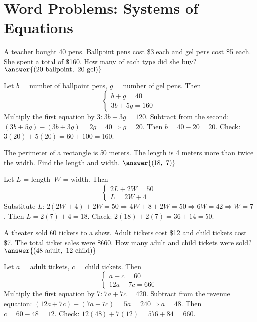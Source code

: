 \documentclass{ximera}
\begin{document}


\section*{Word Problems: Systems of Equations}

\begin{problem}
A teacher bought 40 pens. Ballpoint pens cost \$3 each and gel pens cost \$5 each. She spent a total of \$160. How many of each type did she buy?
$\answer{(20\ \text{ballpoint},\ 20\ \text{gel})}$
\begin{feedback}
Let \(b\) = number of ballpoint pens, \(g\) = number of gel pens. Then
\[
\begin{cases}
b + g = 40\\[4pt]
3b + 5g = 160
\end{cases}
\]
Multiply the first equation by 3: \(3b+3g=120\). Subtract from the second: \((3b+5g)-(3b+3g)=2g=40\Rightarrow g=20\). Then \(b=40-20=20\). Check: \(3(20)+5(20)=60+100=160\).
\end{feedback}
\end{problem}

\begin{problem}
The perimeter of a rectangle is 50 meters. The length is 4 meters more than twice the width. Find the length and width.
$\answer{(18,\ 7)}$
\begin{feedback}
Let \(L\) = length, \(W\) = width. Then
\[
\begin{cases}
2L+2W=50\\[4pt]
L=2W+4
\end{cases}
\]
Substitute \(L\): \(2(2W+4)+2W=50 \Rightarrow 4W+8+2W=50 \Rightarrow 6W=42 \Rightarrow W=7\). Then \(L=2(7)+4=18\). Check: \(2(18)+2(7)=36+14=50\).
\end{feedback}
\end{problem}

\begin{problem}
A theater sold 60 tickets to a show. Adult tickets cost \$12 and child tickets cost \$7. The total ticket sales were \$660. How many adult and child tickets were sold?
$\answer{(48\ \text{adult},\ 12\ \text{child})}$
\begin{feedback}
Let \(a\) = adult tickets, \(c\) = child tickets. Then
\[
\begin{cases}
a+c=60\\[4pt]
12a+7c=660
\end{cases}
\]
Multiply the first equation by 7: \(7a+7c=420\). Subtract from the revenue equation: \((12a+7c)-(7a+7c)=5a=240\Rightarrow a=48\). Then \(c=60-48=12\). Check: \(12(48)+7(12)=576+84=660\).
\end{feedback}
\end{problem}

\end{document}
